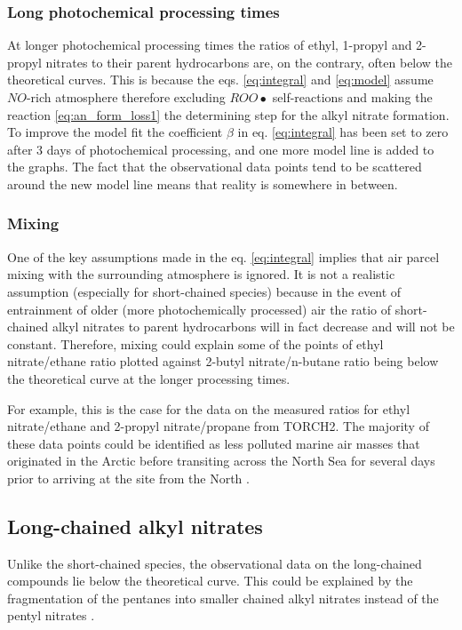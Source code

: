 \documentclass[11pt,a4paper]{article}
\begin{document}
\subsubsection{Long photochemical processing times} \label{sec:short_an_long_time}
At longer photochemical processing times the ratios of ethyl, 1-propyl and 2-propyl nitrates to their parent hydrocarbons are, on the contrary, often below the theoretical curves. This is because the eqs. \eqref{eq:integral} and \eqref{eq:model} assume $NO$-rich atmosphere therefore excluding $ROO\bullet$ self-reactions and making the reaction \eqref{eq:an_form_loss1} the determining step for the alkyl nitrate formation. To improve the model fit the coefficient $\beta$ in eq. \eqref{eq:integral} has been set to zero after 3 days of photochemical processing, and one more model line is added to the graphs. The fact that the observational data points tend to be scattered around the new model line means that reality is somewhere in between.

\subsubsection{Mixing} \label{sec:short_an_mixing}
One of the key assumptions made in the eq. \eqref{eq:integral} implies that air parcel mixing with the surrounding atmosphere is ignored. It is not a realistic assumption (especially for short-chained species) because in the event of entrainment of older (more photochemically processed) air the ratio of short-chained alkyl nitrates to parent hydrocarbons will in fact decrease and will not be constant. Therefore, mixing could explain some of the points of ethyl nitrate/ethane ratio plotted against 2-butyl nitrate/n-butane ratio being below the theoretical curve at the longer processing times.

For example, this is the case for the data on the measured ratios for ethyl nitrate/ethane and 2-propyl nitrate/propane from TORCH2. The majority of these data points could be identified as less polluted marine air masses that originated in the Arctic before transiting across the North Sea for several days prior to arriving at the site from the North \citep{Worton2010}.

\subsection{Long-chained alkyl nitrates} \label{sec:long_an}
Unlike the short-chained species, the observational data on the long-chained compounds lie below the theoretical curve. This could be explained by the fragmentation of the pentanes into smaller chained alkyl nitrates instead of the pentyl nitrates \citep{Reeves2007}.
\end{document}
